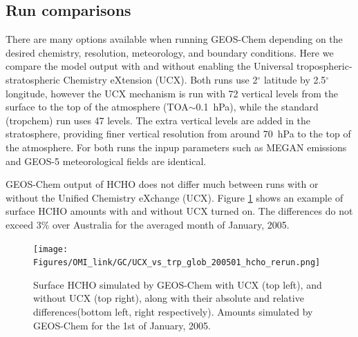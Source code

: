     \subsection{Run comparisons}
    
      There are many options available when running GEOS-Chem depending on the desired chemistry, resolution, meteorology, and boundary conditions.
      Here we compare the model output with and without enabling the Universal tropospheric-stratospheric Chemistry eXtension (UCX).
      Both runs use 2$^{\circ}$ latitude by 2.5$^{\circ}$ longitude, however the UCX mechanism is run with 72 vertical levels from the surface to the top of the atmosphere (TOA$\sim$0.1~hPa), while the standard (tropchem) run uses 47 levels.
      The extra vertical levels are added in the stratosphere, providing finer vertical resolution from around 70~hPa to the top of the atmosphere.
      For both runs the inpup parameters such as MEGAN emissions and GEOS-5 meteorological fields are identical.
      
      GEOS-Chem output of HCHO does not differ much between runs with or without the Unified Chemistry eXchange (UCX).
      Figure \ref{Model:GC:running:fig_UCXvsTrop_HCHO} shows an example of surface HCHO amounts with and without UCX turned on.
      The differences do not exceed 3\% over Australia for the averaged month of January, 2005.
      
      \begin{figure}%
        \texttt{[image: Figures/OMI\_link/GC/UCX\_vs\_trp\_glob\_200501\_hcho\_rerun.png]}
        \caption{ %
          Surface HCHO simulated by GEOS-Chem with UCX (top left), and without UCX (top right), along with their absolute and relative differences(bottom left, right respectively).
          Amounts simulated by GEOS-Chem for the 1st of January, 2005.
        }
        \label{Model:GC:running:fig_UCXvsTrop_HCHO}
      \end{figure}
      
